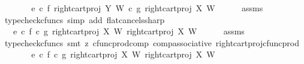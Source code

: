\begin{isabellebody}
\ \ \isamarkupfalse%
\ \isamarkupfalse%
\ {\isachardoublequoteopen}{\isachardot}{\kern0pt}{\isachardot}{\kern0pt}{\isachardot}{\kern0pt}\ {\isacharequal}{\kern0pt}\ {\isacharparenleft}{\kern0pt}{\isacharparenleft}{\kern0pt}e\isactrlsup {\isasymflat}\ {\isasymcirc}\isactrlsub c\ {\isasymlangle}f\isactrlsup {\isasymflat}{\isacharcomma}{\kern0pt}\ right{\isacharunderscore}{\kern0pt}cart{\isacharunderscore}{\kern0pt}proj\ Y\ W{\isasymrangle}{\isacharparenright}{\kern0pt}\ {\isasymcirc}\isactrlsub c\ {\isasymlangle}g\isactrlsup {\isasymflat}{\isacharcomma}{\kern0pt}\ right{\isacharunderscore}{\kern0pt}cart{\isacharunderscore}{\kern0pt}proj\ X\ W{\isasymrangle}{\isacharparenright}{\kern0pt}\isactrlsup {\isasymsharp}{\isachardoublequoteclose}\isanewline
\ \ \ \ \isamarkupfalse%
\ assms\ \isamarkupfalse%
\ {\isacharparenleft}{\kern0pt}typecheck{\isacharunderscore}{\kern0pt}cfuncs{\isacharcomma}{\kern0pt}\ simp\ add{\isacharcolon}{\kern0pt}\ flat{\isacharunderscore}{\kern0pt}cancels{\isacharunderscore}{\kern0pt}sharp{\isacharparenright}{\kern0pt}\ \ \ \ \isanewline
\ \ \isamarkupfalse%
\ \isamarkupfalse%
\ {\isachardoublequoteopen}{\isachardot}{\kern0pt}{\isachardot}{\kern0pt}{\isachardot}{\kern0pt}\ {\isacharequal}{\kern0pt}\ {\isacharparenleft}{\kern0pt}e\isactrlsup {\isasymflat}\ {\isasymcirc}\isactrlsub c\ {\isasymlangle}f\isactrlsup {\isasymflat}\ {\isasymcirc}\isactrlsub c\ {\isasymlangle}g\isactrlsup {\isasymflat}{\isacharcomma}{\kern0pt}\ right{\isacharunderscore}{\kern0pt}cart{\isacharunderscore}{\kern0pt}proj\ X\ W{\isasymrangle}\ {\isacharcomma}{\kern0pt}right{\isacharunderscore}{\kern0pt}cart{\isacharunderscore}{\kern0pt}proj\ X\ W{\isasymrangle}{\isacharparenright}{\kern0pt}\isactrlsup {\isasymsharp}{\isachardoublequoteclose}\isanewline
\ \ \ \ \isamarkupfalse%
\ assms\ \isamarkupfalse%
\ {\isacharparenleft}{\kern0pt}typecheck{\isacharunderscore}{\kern0pt}cfuncs{\isacharcomma}{\kern0pt}\ smt\ {\isacharparenleft}{\kern0pt}z{}{\isacharparenright}{\kern0pt}\ cfunc{\isacharunderscore}{\kern0pt}prod{\isacharunderscore}{\kern0pt}comp\ comp{\isacharunderscore}{\kern0pt}associative{}\ right{\isacharunderscore}{\kern0pt}cart{\isacharunderscore}{\kern0pt}proj{\isacharunderscore}{\kern0pt}cfunc{\isacharunderscore}{\kern0pt}prod{\isacharparenright}{\kern0pt}\isanewline
\ \ \isamarkupfalse%
\ \isamarkupfalse%
\ {\isachardoublequoteopen}{\isachardot}{\kern0pt}{\isachardot}{\kern0pt}{\isachardot}{\kern0pt}\ {\isacharequal}{\kern0pt}\ {\isacharparenleft}{\kern0pt}e\isactrlsup {\isasymflat}\ {\isasymcirc}\isactrlsub c\ {\isasymlangle}{\isacharparenleft}{\kern0pt}f\isactrlsup {\isasymflat}\ {\isasymcirc}\isactrlsub c\ {\isasymlangle}g\isactrlsup {\isasymflat}{\isacharcomma}{\kern0pt}\ right{\isacharunderscore}{\kern0pt}cart{\isacharunderscore}{\kern0pt}proj\ X\ W{\isasymrangle}{\isacharparenright}{\kern0pt}\isactrlsup {\isasymsharp}\isactrlsup {\isasymflat}\ {\isacharcomma}{\kern0pt}right{\isacharunderscore}{\kern0pt}cart{\isacharunderscore}{\kern0pt}proj\ X\ W{\isasymrangle}{\isacharparenright}{\kern0pt}\isactrlsup {\isasymsharp}{\isachardoublequoteclose}\isanewline

\end{isabellebody}
